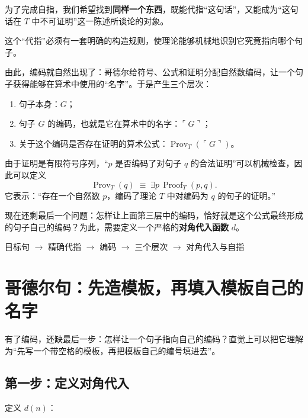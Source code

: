 \documentclass[11pt,a4paper]{article}
\newcommand{\Prov}{\operatorname{Prov}}
\newcommand{\code}[1]{\ulcorner #1\urcorner}
\begin{document}
为了完成自指，我们希望找到\textbf{同样一个东西}，既能代指“这句话”，又能成为“这句话在 $T$ 中不可证明”这一陈述所谈论的对象。

\begin{keybox}[真正的要求]
这个“代指”必须有一套明确的构造规则，使理论能够机械地识别它究竟指向哪个句子。
\end{keybox}

由此，编码就自然出现了：哥德尔给符号、公式和证明分配自然数编码，让一个句子获得能够在算术中使用的“名字”。于是产生三个层次：

\begin{plainbox}[编码产生的三个层次]
\begin{enumerate}[label=\arabic*.,leftmargin=2.2em]
  \item 句子本身：$G$；
  \item 句子 $G$ 的编码，也就是它在算术中的名字：$\code{G}$；
  \item 关于这个编码是否存在证明的算术公式：$\Prov_T(\code{G})$。
\end{enumerate}
\end{plainbox}

由于证明是有限符号序列，“$p$ 是否编码了对句子 $q$ 的合法证明”可以机械检查，因此可以定义
\[
 \Prov_T(q)\;\equiv\;\exists p\,\operatorname{Proof}_T(p,q).
\]
它表示：“存在一个自然数 $p$，编码了理论 $T$ 中对编码为 $q$ 的句子的证明。”

现在还剩最后一个问题：怎样让上面第三层中的编码，恰好就是这个公式最终形成的句子自己的编码？为此，需要定义一个严格的\textbf{对角代入函数} $d$。

\begin{keybox}[从目标到技术构造]
\centering
目标句 $\longrightarrow$ 精确代指 $\longrightarrow$ 编码 $\longrightarrow$ 三个层次
$\longrightarrow$ 对角代入与自指
\end{keybox}

\section{哥德尔句：先造模板，再填入模板自己的名字}

有了编码，还缺最后一步：怎样让一个句子指向自己的编码？直觉上可以把它理解为“先写一个带空格的模板，再把模板自己的编号填进去”。

\subsection{第一步：定义对角代入}

定义 $d(n)$：
\end{document}
